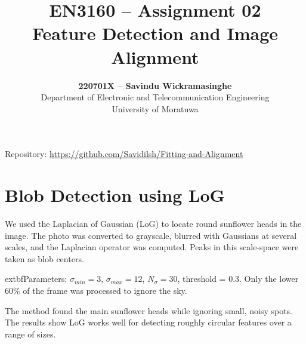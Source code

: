 \documentclass[12pt,a4paper]{article}
\title{\textbf{EN3160 – Assignment 02}\\Feature Detection and Image Alignment}
\author{\textbf{220701X – Savindu Wickramasinghe}\\Department of Electronic and Telecommunication Engineering\\University of Moratuwa}
\date{}
\begin{document}
\maketitle
\vspace{-8mm}
\tableofcontents
\vspace{4mm}
\begin{center}
{\small Repository: \href{https://github.com/Savidilsh/Fitting-and-Alignment}{\url{https://github.com/Savidilsh/Fitting-and-Alignment}}}
\end{center}

\section{Blob Detection using LoG}
We used the Laplacian of Gaussian (LoG) to locate round sunflower heads in the image. The photo was converted to grayscale, blurred with Gaussians at several scales, and the Laplacian operator was computed. Peaks in this scale-space were taken as blob centers.

	extbf{Parameters:} $\sigma_{min}=3$, $\sigma_{max}=12$, $N_\sigma=30$, threshold = 0.3. Only the lower 60\% of the frame was processed to ignore the sky.

The method found the main sunflower heads while ignoring small, noisy spots. The results show LoG works well for detecting roughly circular features over a range of sizes.
\end{document}
